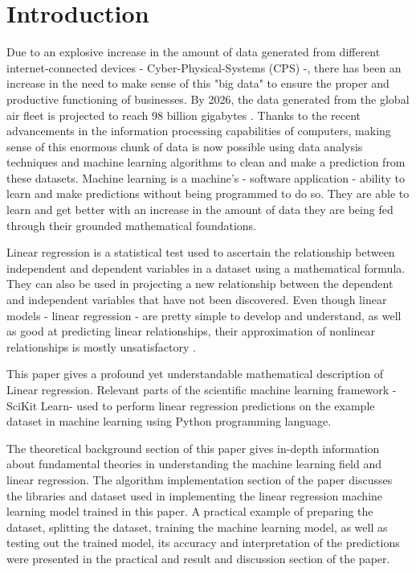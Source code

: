 \documentclass[conference]{IEEEtran}
\begin{document}
\section{Introduction}
Due to an explosive increase in the amount of data generated from different internet-connected devices - Cyber-Physical-Systems (CPS) -, there has been an increase in the need to make sense of this "big data" to ensure the proper and productive functioning of businesses. By 2026, the data generated from the global air fleet is projected to reach 98 billion gigabytes \cite{oliver_wyman}. Thanks to the recent advancements in the information processing capabilities of computers, making sense of this enormous chunk of data is now possible using data analysis techniques and machine learning algorithms to clean and make a prediction from these datasets. Machine learning is a machine's - software application - ability to learn and make predictions without being programmed to do so. They are able to learn and get better with an increase in the amount of data they are being fed through their grounded mathematical foundations.

\quad Linear regression is a statistical test used to ascertain the relationship between independent and dependent variables in a dataset using a mathematical formula. They can also be used in projecting a new relationship between the dependent and independent variables that have not been discovered.
Even though linear models - linear regression - are pretty simple to develop and understand, as well as good at predicting linear relationships, their approximation of nonlinear relationships is mostly unsatisfactory \cite{article_lee}. 

\quad This paper gives a profound yet understandable mathematical description of Linear regression. Relevant parts of the scientific machine learning framework -SciKit Learn- used to perform linear regression predictions on the example dataset in machine learning using Python programming language. 

\quad The theoretical background section of this paper gives in-depth information about fundamental theories in understanding the machine learning field and linear regression. The algorithm implementation section of the paper discusses the libraries and dataset used in implementing the linear regression machine learning model trained in this paper. A practical example of preparing the dataset, splitting the dataset, training the machine learning model, as well as testing out the trained model, its accuracy and interpretation of the predictions were presented in the practical and result and discussion section of the paper.
\end{document}
